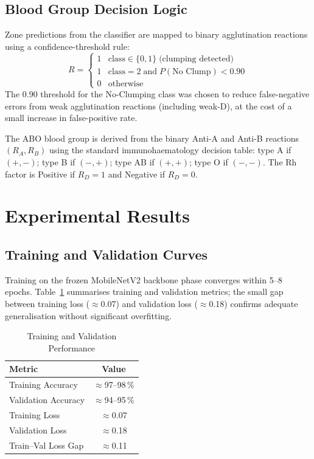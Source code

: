 \documentclass[journal]{IEEEtran}
\begin{document}
\subsection{Blood Group Decision Logic}

Zone predictions from the classifier are mapped to binary
agglutination reactions using a confidence-threshold rule:
\begin{equation}
  R =
  \begin{cases}
    1 & \text{class} \in \{0,1\} \;\text{(clumping detected)} \\
    1 & \text{class} = 2 \;\text{and}\; P(\text{No Clump}) < 0.90 \\
    0 & \text{otherwise}
  \end{cases}
  \label{eq:reaction}
\end{equation}
The 0.90 threshold for the No-Clumping class was chosen to reduce
false-negative errors from weak agglutination reactions (including
weak-D), at the cost of a small increase in false-positive rate.

The ABO blood group is derived from the binary Anti-A and Anti-B
reactions $(R_A, R_B)$ using the standard immunohaematology
decision table:
type A if $(+,-)$; type B if $(-,+)$;
type AB if $(+,+)$; type O if $(-,-)$.
The Rh factor is Positive if $R_D{=}1$ and Negative if $R_D{=}0$.

\section{Experimental Results}
\label{sec:results}

\subsection{Training and Validation Curves}

Training on the frozen MobileNetV2 backbone phase converges within
5--8 epochs.
Table~\ref{tab:results} summarises training and validation metrics;
the small gap between training loss ($\approx$0.07) and validation
loss ($\approx$0.18) confirms adequate generalisation without
significant overfitting.

\begin{table}[htbp]
  \caption{Training and Validation Performance}
  \label{tab:results}
  \centering
  \renewcommand{\arraystretch}{1.1}
  \begin{tabular}{lc}
    \toprule
    \textbf{Metric} & \textbf{Value} \\
    \midrule
    Training Accuracy   & $\approx$97--98\,\% \\
    Validation Accuracy & $\approx$94--95\,\% \\
    Training Loss       & $\approx$0.07 \\
    Validation Loss     & $\approx$0.18 \\
    Train--Val Loss Gap & $\approx$0.11 \\
    \bottomrule
  \end{tabular}
\end{table}
\end{document}
